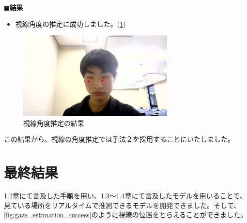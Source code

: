 $\blacksquare$\textbf{結果}
\begin{itemize}
    \item 視線角度の推定に成功しました。(\ref{fig:gaze_direction_estimation_success})
\end{itemize}

\begin{figure}[!ht]
    \centering
    \includegraphics[width=0.7\textwidth]{eye-track-cursor/fig/gaze_direction_result.png}
    \caption{視線角度推定の結果}
    \label{fig:gaze_direction_estimation_success}
\end{figure}
この結果から、視線の角度推定では手法２を採用することにいたしました。
\section{最終結果}
1.2章にて言及した手順を用い、1.3～1.4章にて言及したモデルを用いることで、見ている場所をリアルタイムで推測できるモデルを開発できました。そして、\ref{fig:gaze_estimation_success}のように視線の位置をとらえることができました。\\

